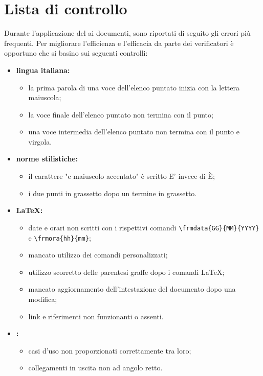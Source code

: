 \section{Lista di controllo}
Durante l'applicazione del  ai documenti, sono riportati di seguito gli errori più frequenti. Per migliorare l'efficienza e l'efficacia da parte dei verificatori è opportuno che si basino sui seguenti controlli:
	\begin{itemize}
		\item \textbf{lingua italiana:}
		\begin{itemize}
			\item la prima parola di una voce dell'elenco puntato inizia con la lettera maiuscola;
			\item la voce finale dell'elenco puntato non termina con il punto;
			\item una voce intermedia dell'elenco puntato non termina con il punto e virgola.
		\end{itemize}
		\item \textbf{norme stilistiche:}
		\begin{itemize}
			\item il carattere "e maiuscolo accentato" è scritto E' invece di È;
			\item i due punti in grassetto dopo un termine in grassetto.
		\end{itemize}
		\item \textbf{\LaTeX:}
		\begin{itemize}
			\item date e orari non scritti con i rispettivi comandi \texttt{\textbackslash frmdata\{GG\}\{MM\}\{YYYY\}} e \texttt{\textbackslash frmora\{hh\}\{mm\}};
			\item mancato utilizzo dei comandi personalizzati;
			\item utilizzo scorretto delle parentesi graffe dopo i comandi \LaTeX;
			\item mancato aggiornamento dell'intestazione del documento dopo una modifica;
			\item link e riferimenti non funzionanti o assenti.
		\end{itemize}
		\item \textbf{:}
		\begin{itemize}
			\item casi d'uso non proporzionati correttamente tra loro;
			\item collegamenti in uscita non ad angolo retto.
		\end{itemize}

\end{itemize}
